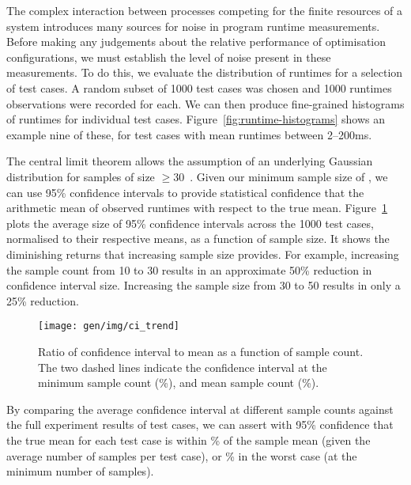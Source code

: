 The complex interaction between processes competing for the finite
resources of a system introduces many sources for noise in program
runtime measurements. Before making any judgements about the relative
performance of optimisation configurations, we must establish the
level of noise present in these measurements. To do this, we evaluate
the distribution of runtimes for a selection of test cases. A random
subset of 1000 test cases was chosen and 1000 runtimes observations
were recorded for each. We can then produce fine-grained histograms of
runtimes for individual test
cases. Figure~\ref{fig:runtime-histograms} shows an example nine of
these, for test cases with mean runtimes between 2--200ms.

The central limit theorem allows the assumption of an underlying
Gaussian distribution for samples of size $\ge 30$~\cite{Georges2007}.
Given our minimum sample size of , we can
use 95\% confidence intervals to provide statistical confidence that
the arithmetic mean of observed runtimes with respect to the true
mean. Figure~\ref{fig:ci-trends} plots the average size of 95\%
confidence intervals across the 1000 test cases, normalised to their
respective means, as a function of sample size. It shows the
diminishing returns that increasing sample size provides. For example,
increasing the sample count from 10 to 30 results in an approximate
50\% reduction in confidence interval size. Increasing the sample size
from 30 to 50 results in only a 25\% reduction.

\begin{figure}
\centering
\texttt{[image: gen/img/ci\_trend]}
\caption{%
  Ratio of confidence interval to mean as a function of sample
  count. The two dashed lines indicate the confidence interval at the
  minimum sample count (\%), and mean sample count
  (\%).%
}
\label{fig:ci-trends}
\end{figure}

By comparing the average confidence interval at different sample
counts against the full experiment results of
 test cases, we can assert with 95\%
confidence that the true mean for each test case is within
\% of the sample mean (given the average number of
samples per test case), or \% in the worst case (at
the minimum number of samples).


